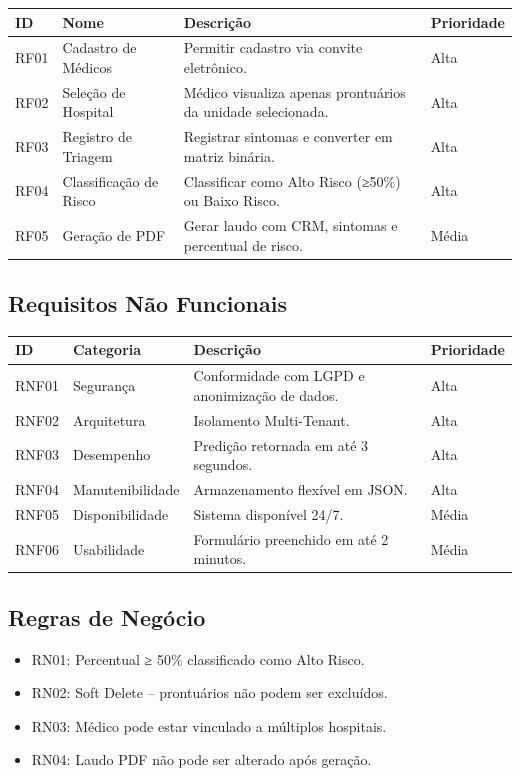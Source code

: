 \documentclass[12pt,a4paper]{article}
\begin{document}
\begin{longtable}{|p{1.5cm}|p{3cm}|p{6cm}|p{2cm}|}
\hline
\textbf{ID} & \textbf{Nome} & \textbf{Descrição} & \textbf{Prioridade} \\
\hline
RF01 & Cadastro de Médicos & Permitir cadastro via convite eletrônico. & Alta \\
\hline
RF02 & Seleção de Hospital & Médico visualiza apenas prontuários da unidade selecionada. & Alta \\
\hline
RF03 & Registro de Triagem & Registrar sintomas e converter em matriz binária. & Alta \\
\hline
RF04 & Classificação de Risco & Classificar como Alto Risco (≥50\%) ou Baixo Risco. & Alta \\
\hline
RF05 & Geração de PDF & Gerar laudo com CRM, sintomas e percentual de risco. & Média \\
\hline
\end{longtable}

\subsection{Requisitos Não Funcionais}

\begin{longtable}{|p{1.5cm}|p{4cm}|p{6cm}|p{2cm}|}
\hline
\textbf{ID} & \textbf{Categoria} & \textbf{Descrição} & \textbf{Prioridade} \\
\hline
RNF01 & Segurança & Conformidade com LGPD e anonimização de dados. & Alta \\
\hline
RNF02 & Arquitetura & Isolamento Multi-Tenant. & Alta \\
\hline
RNF03 & Desempenho & Predição retornada em até 3 segundos. & Alta \\
\hline
RNF04 & Manutenibilidade & Armazenamento flexível em JSON. & Alta \\
\hline
RNF05 & Disponibilidade & Sistema disponível 24/7. & Média \\
\hline
RNF06 & Usabilidade & Formulário preenchido em até 2 minutos. & Média \\
\hline
\end{longtable}

\subsection{Regras de Negócio}

\begin{itemize}
    \item RN01: Percentual ≥ 50\% classificado como Alto Risco.
    \item RN02: Soft Delete – prontuários não podem ser excluídos.
    \item RN03: Médico pode estar vinculado a múltiplos hospitais.
    \item RN04: Laudo PDF não pode ser alterado após geração.
\end{itemize}
\end{document}
